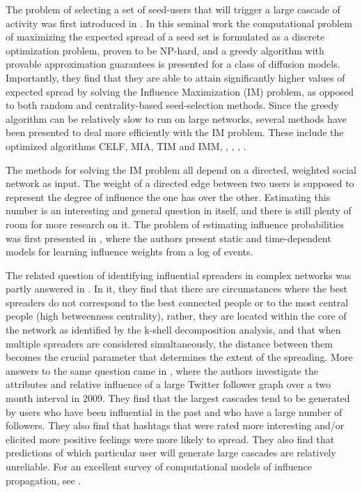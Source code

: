 \documentclass[sigconf]{acmart}
\begin{document}
The problem of selecting a set of seed-users that will trigger a large cascade of activity was first introduced in \cite{kempe2003maximizing}. In this seminal work the computational problem of maximizing the expected spread of a seed set is formulated as a discrete optimization problem, proven to be NP-hard, and a greedy algorithm with provable approximation guarantees is presented for a class of diffusion models. Importantly, they find that they are able to attain significantly higher values of expected spread by solving the Influence Maximization (IM) problem, as opposed to both random and centrality-based seed-selection methods. Since the greedy algorithm can be relatively slow to run on large networks, several methods have been presented to deal more efficiently with the IM problem. These include the optimized algorithms CELF, MIA, TIM and IMM, \cite{chen2009efficient}, \cite{chen2010scalable}, \cite{tang2014influence}, \cite{tang2015influence}. 

The methods for solving the IM problem all depend on a directed, weighted social network as input. The weight of a directed edge between two users is supposed to represent the degree of influence the one has over the other. Estimating this number is an interesting and general question in itself, and there is still plenty of room for more research on it. The problem of estimating influence probabilities was first presented in \cite{goyal2010learning}, where the authors present static and time-dependent models for learning influence weights from a log of events. 

The related question of identifying influential spreaders in complex networks was partly answered in \cite{kitsak2010identification}. In it, they find that there are circumstances where the best spreaders do not correspond to the best connected people or to the most central people (high betweenness centrality), rather, they are located within the core of the network as identified by the k-shell decomposition analysis, and that when multiple spreaders are considered simultaneously, the distance between them becomes the crucial parameter that determines the extent of the spreading. More answers to the same question came in \cite{bakshy2011everyone}, where the authors investigate the attributes and relative influence of a large Twitter follower graph over a two month interval in 2009. They find that the largest cascades tend to be generated by users who have been influential in the past and who have a large number of followers. They also find that hashtags that were rated more interesting and/or elicited more positive feelings were more likely to spread. They also find that predictions of which particular user will generate large cascades are relatively unreliable. For an excellent survey of computational models of influence propagation, see \cite{bonchi2011influence}.
\end{document}
